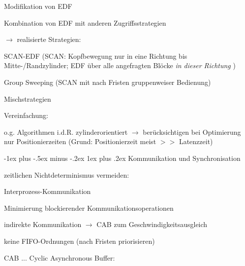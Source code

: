 \documentclass[a4paper]{article}
\makeatletter
\renewcommand{\subsubsection}{\@startsection{subsubsection}{3}{0mm}%
 {-1ex plus -.5ex minus -.2ex}%
 {1ex plus .2ex}%
 {\normalfont\small\bfseries}}
\makeatother
\begin{document}
\begin{multicols}{3}
\begin{itemize*}
\begin{enumerate*}
            \item Modifikation von EDF
            \item Kombination von EDF mit anderen Zugriffsstrategien
        \end{enumerate*}
    \end{itemize*}

    $\rightarrow$ realisierte Strategien:

    \begin{enumerate*}
        \item SCAN-EDF (SCAN: Kopfbewegung nur in eine Richtung bis
        Mitte-/Randzylinder; EDF über alle angefragten Blöcke \emph{in dieser
            Richtung} )
        \item Group Sweeping (SCAN mit nach Fristen gruppenweiser Bedienung)
        \item Mischstrategien
    \end{enumerate*}

    \begin{itemize*}
        \item Vereinfachung:
        \begin{itemize*}
            \item o.g. Algorithmen i.d.R. zylinderorientiert $\rightarrow$ berücksichtigen bei Optimierung nur Positionierzeiten (Grund: Positionierzeit meist $>>$ Latenzzeit)
        \end{itemize*}
    \end{itemize*}


    \subsubsection{Kommunikation und
        Synchronisation}

    \begin{itemize*}
        \item zeitlichen Nichtdeterminismus vermeiden:
        \begin{enumerate*}

            \item Interprozess-Kommunikation
        \end{enumerate*}
        \begin{itemize*}
            \item Minimierung blockierender Kommunikationsoperationen
            \item indirekte Kommunikation $\rightarrow$ CAB zum Geschwindigkeitsausgleich
            \item keine FIFO-Ordnungen (nach Fristen priorisieren)
            \item CAB ... Cyclic Asynchronous Buffer: %
        \end{itemize*}
        \begin{enumerate*}



\end{enumerate*}
\end{itemize*}
\end{multicols}
\end{document}
